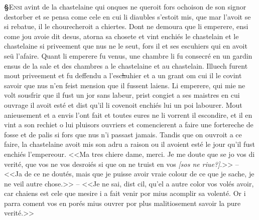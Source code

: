 \documentclass[12pt]{article} %
\newcommand{\colmar}[1]{\marginnote{[#1]}}          %
\newcommand{\supplied}[1]{\textlangle#1\textrangle} %
\newcommand{\uncertain}[1]{\textit{[#1?]}} %
\newcommand{\del}[1]{\sout{#1}}      %
\newcounter{paranum}
\newcommand{\pnum}{\stepcounter{paranum}\textbf{§\arabic{paranum}}\quad}
\begin{document}
\pnum \lettrine[lines=2]{\color{darkred}E}{nsi} avint de la chastelaine qui onques ne queroit fors ochoison de son signor destorber et se pensa come cele en cui li diaubles s'estoit mis, que mar l'avoit se si rebatue, il le chourecheroit a chiertes. Dont ne demoura que li emperere, ensi come jou avoie dit desus, atorna sa chosete et vint enchiés le chastelain et le chastelaine si priveement que nus ne le seut, fors il et ses escuhiers qui en avoit seü l'afaire. Quant li emperere fu venus, une chambre li fu consecré en un gardin ensus de la sale et des chambres a le chastelaine et au chastelain. Illuech furent mout priveement et fu deffendu a l'esc\del{h}uhier et a un grant om cui il le covint savoir que nus n'en feist mension que il fussent laiens. Li emperere, qui mie ne volt sousfrir que il fust un jor sans labeur, prist congiet a ses maistres en cui ouvrage il avoit esté et dist qu'il li covenoit enchiés lui un poi labourer. Mout anieusement et a envis l'ont fait et toutes eures ne li vorrent il escondire, et il en vint a son rechiet o lui pluisors ouvriers et comencierent a faire une fortereche de fosse et de palis si fors que nus n'i \colmar{12rb}\colmar{b} passast jamais. Tandis que on ouvroit a ce faire, la chast\supplied{elaine} avoit mis son adru a raison ou il avoient esté le jour qu'il fu\supplied{st} enchiés l'empereour. <<Ma tres chiere dame, merci. Je me doute que se jo vos di verité, que vos ne vos desroiés si que on ne truist en vos \uncertain{sos ne riue}.>> -- <<Ja de ce ne doutés, mais que je puisse avoir vraie colour de ce que je sache, je ne veil autre chose.>> -- <<Je ne sai, dist cil, qu'el a autre color vos volés avoir, car chaiens est cele que mesire i a fait venir por mius acomplir sa volenté. Or i parra coment vos en porés mius ouvrer por plus malitiosement savoir la pure verité.>>
\end{document}
